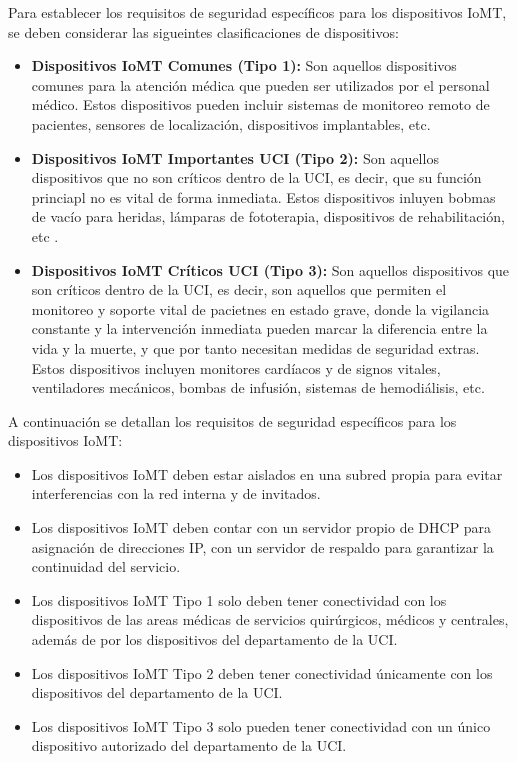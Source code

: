Para establecer los requisitos de seguridad específicos para los dispositivos IoMT, se deben considerar las sigueintes clasificaciones de dispositivos:
\begin{itemize}
    \item \textbf{Dispositivos IoMT Comunes (Tipo 1):} Son aquellos dispositivos comunes para la atención médica que pueden ser utilizados por el personal 
    médico. Estos dispositivos pueden incluir sistemas de monitoreo remoto de pacientes, sensores de localización, dispositivos implantables, etc.
    \item \textbf{Dispositivos IoMT Importantes UCI (Tipo 2):} Son aquellos dispositivos que no son críticos dentro de la UCI, es decir, que su función princiapl no es vital de forma 
    inmediata. Estos dispositivos inluyen bobmas de vacío para heridas, lámparas de fototerapia, dispositivos de rehabilitación, etc \cite{IoMT-UCI}.
    \item \textbf{Dispositivos IoMT Críticos UCI (Tipo 3):} Son aquellos dispositivos que son críticos dentro de la UCI, es decir, son aquellos que permiten el monitoreo y soporte
    vital de pacietnes en estado grave, donde la vigilancia constante y la intervención inmediata pueden marcar la diferencia entre la vida y la muerte, y que por tanto necesitan medidas
    de seguridad extras. Estos dispositivos incluyen monitores cardíacos y de signos vitales, ventiladores mecánicos, bombas de infusión, sistemas de hemodiálisis, etc\cite{IoMT-UCI}.
\end{itemize}
A continuación se detallan los requisitos de seguridad específicos para los dispositivos IoMT:
\begin{itemize}
    \item Los dispositivos IoMT deben estar aislados en una subred propia para evitar interferencias con la red interna y de invitados.
    \item Los dispositivos IoMT deben contar con un servidor propio de DHCP para asignación de direcciones IP, con un servidor de respaldo para garantizar la continuidad del servicio.
    \item Los dispositivos IoMT Tipo 1 solo deben tener conectividad con los dispositivos de las areas médicas de servicios quirúrgicos, médicos y centrales, 
    además de por los dispositivos del departamento de la UCI.
    \item Los dispositivos IoMT Tipo 2 deben tener conectividad únicamente con los dispositivos del departamento de la UCI.
    \item Los dispositivos IoMT Tipo 3 solo pueden tener conectividad con un único dispositivo autorizado del departamento de la UCI.
\end{itemize}

